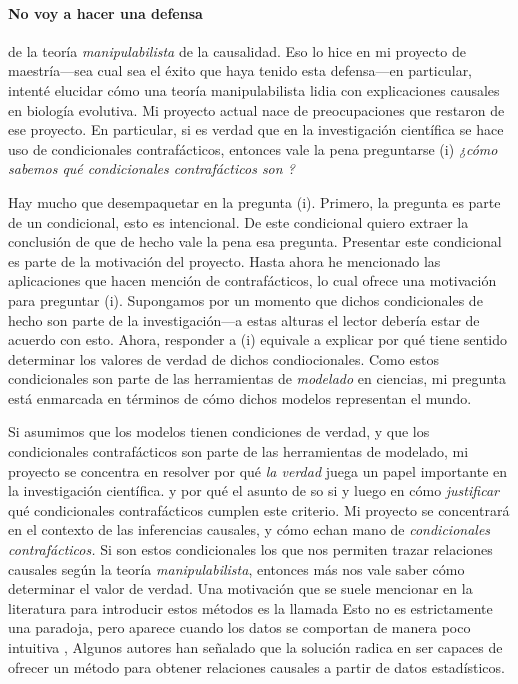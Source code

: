 \paragraph{No voy a hacer una defensa} de la teoría
\emph{manipulabilista} de la causalidad. Eso lo hice en mi
proyecto de maestría---sea cual sea el éxito que haya tenido
esta defensa---en particular, intenté elucidar cómo una
teoría manipulabilista lidia con explicaciones causales en
biología evolutiva. Mi proyecto actual nace de
preocupaciones que restaron de ese proyecto. En particular,
si es verdad que en la investigación científica se hace uso
de condicionales contrafácticos, entonces vale la pena
preguntarse (i) \emph{¿cómo sabemos qué condicionales
contrafácticos son ?}

Hay mucho que desempaquetar en la pregunta (i). Primero, la
pregunta es parte de un condicional, esto es intencional. De
este condicional quiero extraer la conclusión de que de
hecho vale la pena esa pregunta. Presentar este condicional
es parte de la motivación del proyecto. Hasta ahora he
mencionado las aplicaciones que hacen mención de
contrafácticos, lo cual ofrece una motivación para preguntar
(i). Supongamos por un momento que dichos condicionales de
hecho son parte de la investigación---a estas alturas el
lector debería estar de acuerdo con esto. Ahora, responder a
(i) equivale a explicar por qué tiene sentido determinar los
valores de verdad de dichos condiocionales. Como estos
condicionales son parte de las herramientas de
\emph{modelado} en ciencias, mi pregunta está enmarcada en
términos de cómo dichos modelos representan el mundo.

Si asumimos que los modelos tienen condiciones de verdad, y
que los condicionales contrafácticos son parte de las
herramientas de modelado, mi proyecto se concentra en
resolver por qué \emph{la verdad} juega un papel importante
en la investigación científica.  y por qué el asunto de so
si  y luego en cómo \emph{justificar} qué condicionales
contrafácticos cumplen este criterio. Mi proyecto se
concentrará en el contexto de las inferencias causales, y
cómo echan mano de \emph{condicionales contrafácticos.} Si
son estos condicionales los que nos permiten trazar
relaciones causales según la teoría \emph{manipulabilista},
entonces más nos vale saber cómo determinar el valor de
verdad. Una motivación que se suele mencionar en la
literatura para introducir estos métodos es la llamada
 Esto no es estrictamente una
paradoja, pero aparece cuando los datos se comportan de
manera poco intuitiva \parencite[p.~13]{Hajek2016-HAJOHO},
Algunos autores han señalado que la solución radica en ser
capaces de ofrecer un método para obtener relaciones
causales a partir de datos estadísticos.


